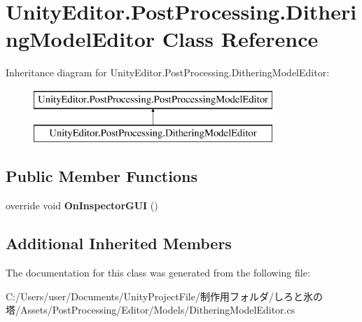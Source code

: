 \hypertarget{class_unity_editor_1_1_post_processing_1_1_dithering_model_editor}{}\section{Unity\+Editor.\+Post\+Processing.\+Dithering\+Model\+Editor Class Reference}
\label{class_unity_editor_1_1_post_processing_1_1_dithering_model_editor}
Inheritance diagram for Unity\+Editor.\+Post\+Processing.\+Dithering\+Model\+Editor\+:\begin{figure}[H]
\begin{center}
\leavevmode
\includegraphics[height=2.000000cm]{class_unity_editor_1_1_post_processing_1_1_dithering_model_editor}
\end{center}
\end{figure}
\subsection*{Public Member Functions}
\begin{DoxyCompactItemize}
\item 
\mbox{\label{class_unity_editor_1_1_post_processing_1_1_dithering_model_editor_a32cce7225dccf96fea7c0d1bc9ff8384}} 
override void {\bfseries On\+Inspector\+G\+UI} ()
\end{DoxyCompactItemize}
\subsection*{Additional Inherited Members}


The documentation for this class was generated from the following file\+:\begin{DoxyCompactItemize}
\item 
C\+:/\+Users/user/\+Documents/\+Unity\+Project\+File/制作用フォルダ/しろと氷の塔/\+Assets/\+Post\+Processing/\+Editor/\+Models/Dithering\+Model\+Editor.\+cs\end{DoxyCompactItemize}
